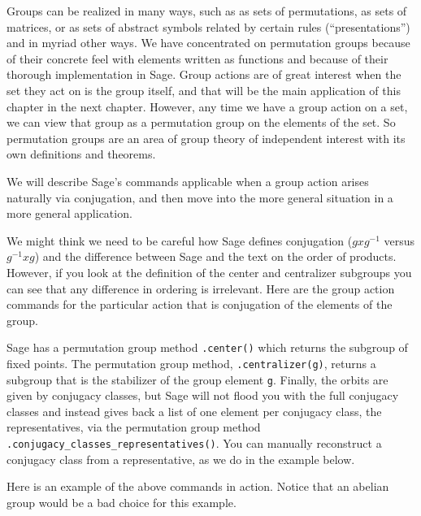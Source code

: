 Groups can be realized in many ways, such as as sets of permutations, as sets of matrices, or as sets of abstract symbols related by certain rules (``presentations'') and in myriad other ways.  We have concentrated on permutation groups because of their concrete feel with elements written as functions and because of their thorough implementation in Sage.  Group actions are of great interest when the set they act on is the group itself, and that will be the main application of this chapter in the next chapter.  However, any time we have a group action on a set, we can view that group as a permutation group on the elements of the set.  So permutation groups are an area of group theory of independent interest with its own definitions and theorems.\par
%
We will describe Sage's commands applicable when a group action arises naturally via conjugation, and then move into the more general situation in a more general application.\par
%
%
We might think we need to be careful how Sage defines conjugation ($gxg^{-1}$ versus $g^{-1}xg$) and the difference between Sage and the text on the order of products.  However, if you look at the definition of the center and centralizer subgroups you can see that any difference in ordering is irrelevant.  Here are the group action commands for the particular action that is conjugation of the elements of the group.\par
%
Sage has a permutation group method \verb?.center()? which returns the subgroup of fixed points.  The permutation group method, \verb?.centralizer(g)?, returns a subgroup that is the stabilizer of the group element \verb?g?.  Finally, the orbits are given by conjugacy classes, but Sage will not flood you with the full conjugacy classes and instead gives back a list of one element per conjugacy class, the representatives, via the permutation group method \verb?.conjugacy_classes_representatives()?.  You can manually reconstruct a conjugacy class from a representative, as we do in the example below.\par
%
Here is an example of the above commands in action.  Notice that an abelian group would be a bad choice for this example.
